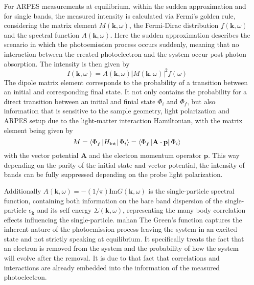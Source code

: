 For ARPES measurements at equilibrium, within the sudden approximation and for single bands, the measured intensity is calculated via Fermi's golden rule, considering the matrix element $M(\mathbf{k}, \omega)$, the Fermi-Dirac distribution $f(\mathbf{k}, \omega)$ and the spectral function $A(\mathbf{k}, \omega)$.
Here the sudden approximation describes the scenario in which the photoemission process occurs suddenly, meaning that no interaction between the created photoelectron and the system occur post photon absorption.
The intensity is then given by
\begin{equation}
	I(\mathbf{k}, \omega) = A(\mathbf{k}, \omega)\left|M(\mathbf{k}, \omega)\right|^2f(\omega)
	\label{eq:arpes_signal}
\end{equation}
The dipole matrix element corresponds to the probability of a transition between an initial and corresponding final state.
It not only contains the probability for a direct transition between an initial and finial state $\Phi_i$ and $\Phi_f$, but also information that is sensitive to the sample geometry, light polarization and ARPES setup due to the light-matter interaction Hamiltonian,
with the matrix element being given by
\begin{equation}
	M = \braket{\Phi_f\left|H_\text{int}\right|\Phi_i} =\braket{\Phi_f\left| \mathbf{A} \cdot \mathbf{p} \right|\Phi_i}
\end{equation}
with the vector potential $\mathbf{A}$ and the electron momentum operator $\mathbf{p}$.
This way depending on the parity of the initial state and vector potential, the intensity of bands can be fully suppressed depending on the probe light polarization.

Additionally $A(\mathbf{k}, \omega)=-(1/\pi)\text{Im}G(\mathbf{k}, \omega)$ is the single-particle spectral function, containing both information on the bare band dispersion of the single-particle $\epsilon_\mathbf{k}$ and its self energy $\Sigma(\mathbf{k}, \omega)$, representing the many body correlation effects influencing the single-particle. \cite{} mahan
The Green's function captures the inherent nature of the photoemission process leaving the system in an excited state and not strictly speaking at equilibrium.
It specifically treats the fact that an electron is removed from the system and the probability of how the system will evolve after the removal.
It is due to that fact that correlations and interactions are already embedded into the information of the measured photoelectron.

